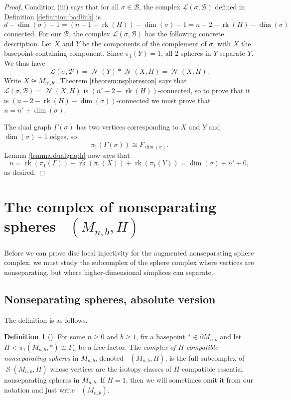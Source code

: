 \documentclass[11pt]{amsart}
\numberwithin{equation}{section}
\theoremstyle{plain}
\theoremstyle{definition}
\newtheorem{defn}[theorem]{Definition}
\newenvironment{definition}[1][]{\begin{defn}[#1]\pushQED{\qed}}{\popQED \end{defn}}
\theoremstyle{remark}
\DeclareMathOperator{\rank}{rk}
\newcommand\cB{\ensuremath{\mathcal{B}}}
\newcommand\cL{\ensuremath{\mathcal{L}}}
\DeclareMathOperator{\Spheres}{\mathcal{S}}
\DeclareMathOperator{\SpheresNS}{\Spheres_{\text{ns}}}
\DeclareMathOperator{\NSpheres}{\mathcal{N}}
\begin{document}
\begin{proof}
Condition (iii) says that for all $\sigma \in \cB$, the complex
$\cL(\sigma,\cB)$ defined in Definition \ref{definition:badlink} is
\[d-\dim(\sigma)-1 = (n-1-\rank(H)) - \dim(\sigma) - 1 = n-2-\rank(H) - \dim(\sigma)\]
connected.  For our $\cB$, the complex $\cL(\sigma,\cB)$
has the following concrete description.  Let $X$ and $Y$ be the components
of the complement of $\sigma$, with $X$ the basepoint-containing component.  Since
$\pi_1(Y) = 1$, all $2$-spheres in $Y$ separate $Y$.  We thus have
\begin{equation}
\label{eqn:anspheresjoin}
\cL(\sigma,\cB) = \NSpheres(Y) \ast \NSpheres(X,H) = \NSpheres(X,H).
\end{equation}
Write $X \cong M_{n',b'}$.  Theorem \ref{theorem:nspherescon} says that $\cL(\sigma,\cB) = \NSpheres(X,H)$
is $(n'-2-\rank(H))$-connected, so to prove that it is $(n-2-\rank(H) - \dim(\sigma))$-connected
we must prove that $n = n' + \dim(\sigma)$.

The dual graph $\Gamma(\sigma)$ has two vertices corresponding to $X$ and $Y$ and $\dim(\sigma)+1$
edges, so
\[\pi_1(\Gamma(\sigma)) \cong F_{\dim(\sigma)}.\]
Lemma \ref{lemma:dualgraph} now says that
\[n = \rank(\pi_1(\Gamma)) + \rank(\pi_1(X)) + \rank(\pi_1(Y)) = \dim(\sigma) + n' + 0,\]
as desired.
\end{proof}

\section{The complex of nonseparating spheres \texorpdfstring{$\SpheresNS(M_{n,b},H)$}{Sns(M,H)}}
\label{section:spheresns}

Before we can prove disc local injectivity for the augmented nonseparating sphere complex,
we must study the subcomplex of the sphere complex where vertices are nonseparating, but
where higher-dimensional simplices can separate.

\subsection{Nonseparating spheres, absolute version}
The definition is as follows.

\begin{definition}
\label{definition:nonseparatingspheres}
For some $n \geq 0$ and $b \geq 1$, fix a basepoint $\ast \in \partial M_{n,b}$
and let $H < \pi_1(M_{n,b},\ast) \cong F_n$ be a free factor.  The {\em complex of
$H$-compatible nonseparating spheres} in $M_{n,b}$, denoted $\SpheresNS(M_{n,b},H)$, is 
the full subcomplex of $\Spheres(M_{n,b},H)$ whose vertices are the isotopy classes
of $H$-compatible essential nonseparating spheres in $M_{n,b}$.
If $H = 1$, then we will sometimes omit it from our notation and just
write $\SpheresNS(M_{n,b})$.
\end{definition}
\end{document}

